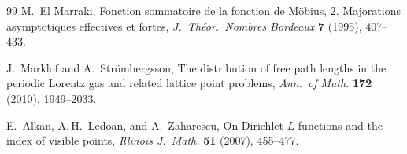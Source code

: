\documentclass[11pt]{article}
\theoremstyle{definition}
\begin{document}
\begin{thebibliography}{99}
M.~El Marraki, Fonction sommatoire de la fonction de M\"obius, 2.
Majorations asymptotiques effectives et fortes,
\emph{J.\ Th\'eor.\ Nombres Bordeaux} \textbf{7} (1995), 407--433.

J.~Marklof and A.~Str\"ombergsson, The distribution of free path
lengths in the periodic Lorentz gas and related lattice point
problems, \emph{Ann.\ of Math.} \textbf{172} (2010), 1949--2033.

E.~Alkan, A.\,H.~Ledoan, and A.~Zaharescu, On Dirichlet $L$-functions
and the index of visible points,
\emph{Illinois J.\ Math.} \textbf{51} (2007), 455--477.

\end{thebibliography}
\end{document}
